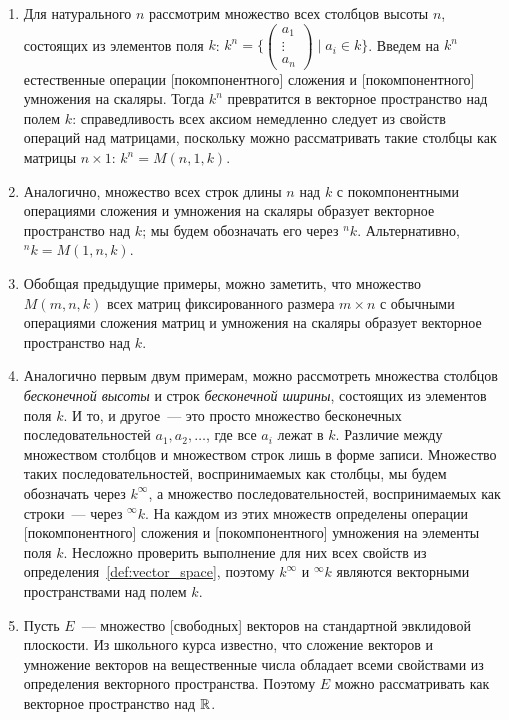 \begin{examples}
\begin{enumerate}
\item Для натурального $n$ рассмотрим множество всех столбцов высоты
  $n$, состоящих из элементов поля $k$:
  $k^n=\{\begin{pmatrix}a_1 \\ \vdots \\ a_n\end{pmatrix}\mid a_i\in
  k\}$. Введем на $k^n$ естественные операции [покомпонентного]
  сложения и [покомпонентного] умножения на скаляры. Тогда $k^n$
  превратится в векторное пространство над полем $k$: справедливость
  всех аксиом немедленно следует из свойств операций над матрицами,
  поскольку можно рассматривать такие столбцы как матрицы $n\times 1$:
  $k^n=M(n,1,k)$.
\item Аналогично, множество всех строк длины $n$ над $k$ с
  покомпонентными операциями сложения и умножения на скаляры образует
  векторное пространство над $k$; мы будем обозначать его через
  ${}^nk$. Альтернативно, ${}^nk=M(1,n,k)$.
\item Обобщая предыдущие примеры, можно заметить, что множество
  $M(m,n,k)$ всех матриц фиксированного размера $m\times n$ с обычными
  операциями сложения матриц и умножения на скаляры образует векторное
  пространство над $k$.
\item Аналогично первым двум примерам, можно рассмотреть множества столбцов
{\em бесконечной высоты} и строк {\em бесконечной ширины}, состоящих
из элементов поля $k$. И то, и другое~--- это просто множество бесконечных
последовательностей $a_1,a_2,\dots$, где все $a_i$ лежат в $k$.
Различие между множеством столбцов и множеством строк лишь в форме записи.
Множество таких последовательностей, воспринимаемых как столбцы,
мы будем обозначать через $k^\infty$, а множество последовательностей,
воспринимаемых как строки~--- через ${}^{\infty}k$.
На каждом из этих множеств определены операции [покомпонентного]
сложения и [покомпонентного] умножения на элементы поля $k$. Несложно
проверить выполнение для них всех свойств из
определения~\ref{def:vector_space}, поэтому $k^\infty$ и ${}^{\infty}k$
являются векторными пространствами над полем $k$.
\item Пусть $E$~--- множество [свободных] векторов на стандартной
  эвклидовой плоскости. Из школьного курса известно, что сложение
  векторов и умножение векторов на вещественные числа обладает всеми
  свойствами из определения векторного пространства. Поэтому $E$ можно
  рассматривать как векторное пространство над $\mathbb R$.

\end{enumerate}
\end{examples}
